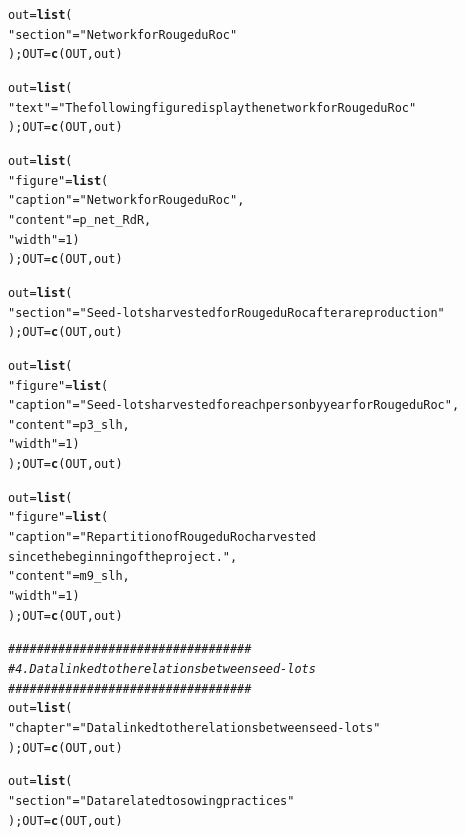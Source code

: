 \documentclass{article}\usepackage[]{graphicx}\usepackage[]{color}
\makeatletter
\newcommand{\hlnum}[1]{\textcolor[rgb]{0.686,0.059,0.569}{#1}}%
\newcommand{\hlstr}[1]{\textcolor[rgb]{0.192,0.494,0.8}{#1}}%
\newcommand{\hlcom}[1]{\textcolor[rgb]{0.678,0.584,0.686}{\textit{#1}}}%
\newcommand{\hlstd}[1]{\textcolor[rgb]{0.345,0.345,0.345}{#1}}%
\newcommand{\hlkwb}[1]{\textcolor[rgb]{0.69,0.353,0.396}{#1}}%
\newcommand{\hlkwd}[1]{\textcolor[rgb]{0.737,0.353,0.396}{\textbf{#1}}}%
\newenvironment{kframe}{%
 \def\at@end@of@kframe{}%
 \ifinner\ifhmode%
  \def\at@end@of@kframe{\end{minipage}}%
  \begin{minipage}{\columnwidth}%
 \fi\fi%
 \def\FrameCommand##1{\hskip\@totalleftmargin \hskip-\fboxsep
 \colorbox{shadecolor}{##1}\hskip-\fboxsep
     \hskip-\linewidth \hskip-\@totalleftmargin \hskip\columnwidth}%
 \MakeFramed {\advance\hsize-\width
   \@totalleftmargin\z@ \linewidth\hsize
   \@setminipage}}%
 {\par\unskip\endMakeFramed%
 \at@end@of@kframe}
\newenvironment{knitrout}{}{} %
\makeatother
\begin{document}
\begin{itemize}
\begin{knitrout}
\begin{kframe}
\begin{alltt}
\hlstd{out} \hlkwb{=} \hlkwd{list}\hlstd{(}
        \hlstr{"section"} \hlstd{=} \hlstr{"Network for Rouge du Roc"}
        \hlstd{); OUT} \hlkwb{=} \hlkwd{c}\hlstd{(OUT, out)}

\hlstd{out} \hlkwb{=} \hlkwd{list}\hlstd{(}
        \hlstr{"text"} \hlstd{=} \hlstr{"The following figure display the network for Rouge du Roc"}
        \hlstd{); OUT} \hlkwb{=} \hlkwd{c}\hlstd{(OUT, out)}

\hlstd{out} \hlkwb{=} \hlkwd{list}\hlstd{(}
        \hlstr{"figure"} \hlstd{=} \hlkwd{list}\hlstd{(}
                \hlstr{"caption"} \hlstd{=} \hlstr{"Network for Rouge du Roc"}\hlstd{,}
                \hlstr{"content"} \hlstd{= p_net_RdR,}
                \hlstr{"width"} \hlstd{=} \hlnum{1}\hlstd{)}
        \hlstd{); OUT} \hlkwb{=} \hlkwd{c}\hlstd{(OUT, out)}

\hlstd{out} \hlkwb{=} \hlkwd{list}\hlstd{(}
        \hlstr{"section"} \hlstd{=} \hlstr{"Seed-lots harvested for Rouge du Roc after a reproduction"}
        \hlstd{); OUT} \hlkwb{=} \hlkwd{c}\hlstd{(OUT, out)}

\hlstd{out} \hlkwb{=} \hlkwd{list}\hlstd{(}
        \hlstr{"figure"} \hlstd{=} \hlkwd{list}\hlstd{(}
                \hlstr{"caption"} \hlstd{=} \hlstr{"Seed-lots harvested for each person by year for Rouge du Roc"}\hlstd{,}
                \hlstr{"content"} \hlstd{= p3_slh,}
                \hlstr{"width"} \hlstd{=} \hlnum{1}\hlstd{)}
        \hlstd{); OUT} \hlkwb{=} \hlkwd{c}\hlstd{(OUT, out)}

\hlstd{out} \hlkwb{=} \hlkwd{list}\hlstd{(}
        \hlstr{"figure"} \hlstd{=} \hlkwd{list}\hlstd{(}
                \hlstr{"caption"} \hlstd{=} \hlstr{"Repartition of Rouge du Roc harvested 
		since the beginning of the project."}\hlstd{,}
                \hlstr{"content"} \hlstd{= m9_slh,}
                \hlstr{"width"} \hlstd{=} \hlnum{1}\hlstd{)}
        \hlstd{); OUT} \hlkwb{=} \hlkwd{c}\hlstd{(OUT, out)}


\hlcom{##################################}
\hlcom{# 4. Data linked to the relations between seed-lots}
\hlcom{##################################}
\hlstd{out} \hlkwb{=} \hlkwd{list}\hlstd{(}
        \hlstr{"chapter"} \hlstd{=} \hlstr{"Data linked to the relations between seed-lots"}
        \hlstd{); OUT} \hlkwb{=} \hlkwd{c}\hlstd{(OUT, out)}


\hlstd{out} \hlkwb{=} \hlkwd{list}\hlstd{(}
        \hlstr{"section"} \hlstd{=} \hlstr{"Data related to sowing practices"}
        \hlstd{); OUT} \hlkwb{=} \hlkwd{c}\hlstd{(OUT, out)}


\end{alltt}
\end{kframe}
\end{knitrout}
\end{itemize}
\end{document}
